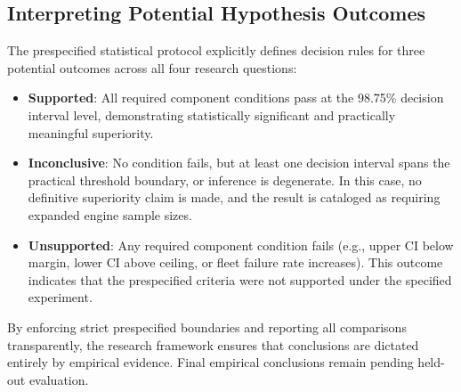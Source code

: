 \subsection{Interpreting Potential Hypothesis Outcomes}
The prespecified statistical protocol explicitly defines decision rules for three potential outcomes across all four research questions:
\begin{itemize}
    \item \textbf{Supported}: All required component conditions pass at the 98.75\% decision interval level, demonstrating statistically significant and practically meaningful superiority.
    \item \textbf{Inconclusive}: No condition fails, but at least one decision interval spans the practical threshold boundary, or inference is degenerate. In this case, no definitive superiority claim is made, and the result is cataloged as requiring expanded engine sample sizes.
    \item \textbf{Unsupported}: Any required component condition fails (e.g., upper CI below margin, lower CI above ceiling, or fleet failure rate increases). This outcome indicates that the prespecified criteria were not supported under the specified experiment.
\end{itemize}
By enforcing strict prespecified boundaries and reporting all comparisons transparently, the research framework ensures that conclusions are dictated entirely by empirical evidence. Final empirical conclusions remain pending held-out evaluation.
